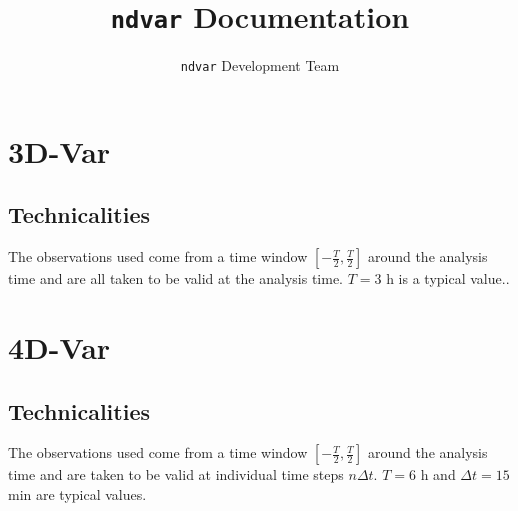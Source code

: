 \documentclass{report}
\title{\texttt{ndvar} Documentation}
\author{\texttt{ndvar} Development Team}
\date{}
\begin{document}
\maketitle

\chapter{3D-Var}
\label{chap:3d-var}

\section{Technicalities}
\label{sec:technicalities_3d-var}

The observations used come from a time window $\left[-\frac{T}{2}, \frac{T}{2}\right]$ around the analysis time and are all taken to be valid at the analysis time. $T = 3$ h is a typical value..

\chapter{4D-Var}
\label{chap:4d-var}
%

\section{Technicalities}
\label{sec:technicalities_4d-var}

The observations used come from a time window $\left[-\frac{T}{2}, \frac{T}{2}\right]$ around the analysis time and are taken to be valid at individual time steps $n\Delta t$. $T = 6$ h and $\Delta t = 15$ min are typical values.

\appendix

\printbibliography
\end{document}
